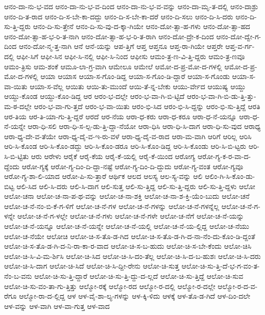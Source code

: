 {ಆನಂ-ದಾ-ನು-ಭ-ವದ
ಆನಂ-ದಾ-ನು-ಭ-ವ-ದಿಂದ
ಆನಂ-ದಾ-ನು-ಭ-ವ-ವನ್ನು
ಆನಂ-ದಾ-ಮೃ-ತ-ದಲ್ಲಿ
ಆನಂ-ದಾಶ್ರು
ಆನಂ-ದಿ-ತ-ರಾದ
ಆನಂ-ದಿ-ಸ-ಬೇ-ಕಾ-ದದ್ದು
ಆನಂ-ದಿ-ಸ-ಬೇ-ಕಾ-ದರೆ
ಆನಂ-ದಿ-ಸಲು
ಆನಂ-ದಿ-ಸಿ-ದರು
ಆನಂ-ದಿ-ಸು-ತ್ತಿ-ದ್ದರು
ಆನಂ-ದಿ-ಸು-ತ್ತೇನೆ
ಆನಂ-ದಿ-ಸು-ವು-ದ-ಕ್ಕಾ-ಗಿಯೇ
ಆನಂ-ದೋ-ತ್ಸಾ-ಹ-ಗಳು
ಆನಂ-ದೋ-ತ್ಸಾ-ಹದ
ಆನಂ-ದೋ-ತ್ಸಾ-ಹ-ಭ-ರಿ-ತ-ನಾಗಿ
ಆನಂ-ದೋ-ತ್ಸಾ-ಹ-ಭ-ರಿ-ತ-ರಾಗಿ
ಆನಂ-ದೋ-ದ್ರೇ-ಕ-ದಿಂದ
ಆನಂ-ದೋ-ದ್ವೇ-ಗ-ದಿಂದ
ಆನಂ-ದೋ-ನ್ಮ-ತ್ತ-ನಾಗಿ
ಆನೆ
ಆನೆ-ಯನ್ನು
ಆಪ-ತ್ತಿಗೆ
ಆಪ್ತ
ಆಪ್ತನೂ
ಆಪ್ತ-ರಾ-ಗಿಯೇ
ಆಪ್ತರೇ
ಆಪ್ತ-ವ-ರ್ಗ-ದಲ್ಲಿ
ಆಫೀ-ಸಿಗೆ
ಆಫೀ-ಸಿನ
ಆಫೀ-ಸಿ-ನಲ್ಲಿ
ಆಫೀ-ಸಿ-ನಿಂದ
ಆಫೀಸು
ಆಮಂ-ತ್ರ-ಣ-ವಿ-ತ್ತಿ-ದ್ದರು
ಆಮಂ-ತ್ರ-ಣವೂ
ಆಮಂ-ತ್ರಿಸು
ಆಮ-ಶಂಕೆ
ಆಮೂ-ಲಾ-ಗ್ರ-ವಾಗಿ
ಆಮೇಲೂ
ಆಮೇಲೆ
ಆಮೋ-ದ-ಪ್ರ-ಮೋ-ದ-ಗಳಲ್ಲಿ
ಆಮೋ-ದ-ಪ್ರ-ಮೋ-ದ-ಗಳಲ್ಲಿ
ಆಯಾ
ಆಯಾಸ
ಆಯಾ-ಸ-ಗೊಂ-ಡಿದ್ದ
ಆಯಾ-ಸ-ಗೊಂ-ಡಿ-ದ್ದಾರೆ
ಆಯಾ-ಸ-ಗೊಂಡು
ಆಯಾ-ಸ-ವಾ-ಯಿತು
ಆಯಾ-ಸ-ವೆಲ್ಲ
ಆಯಿತು
ಆಯಿ-ತು-ಮುಂದೆ
ಆಯಿ-ತೆ-ನ್ನ-ಬೇಕು
ಆಯು-ರ್ವೇದ
ಆಯುಷ್ಯ
ಆಯ್ದು
ಆಯ್ದು-ಕೊಂಡ
ಆಯ್ದು-ಕೊಂ-ಡಿದ್ದ
ಆರ
ಆರಂ-ಭ-ದಲ್ಲೇ
ಆರಂ-ಭ-ವಾ-ಗಿ-ಬಿ-ಟ್ಟಿದೆ
ಆರಂ-ಭ-ವಾ-ಗಿ-ಬಿ-ಡು-ತ್ತಿ-ತ್ತು-ಮ-ಠ-ದಲ್ಲೇ
ಆರಂ-ಭ-ವಾ-ಗು-ತ್ತದೆ
ಆರಂ-ಭ-ವಾ-ಯಿತು
ಆರಂ-ಭಿ-ಸಿದ
ಆರಂ-ಭಿ-ಸಿ-ದ್ದನ್ನು
ಆರಂ-ಭಿ-ಸು-ತ್ತಿದ್ದೆ
ಆರತಿ
ಆರ-ತಿಯ
ಆರ-ತಿ-ಯಾ-ಗು-ತ್ತಿ-ದ್ದರೆ
ಆರದೆ
ಆರ-ನೆಯ
ಆರಾ-ಧ-ಕರು
ಆರಾ-ಧ-ಕರೂ
ಆರಾ-ಧ-ನೆ-ಯನ್ನೂ
ಆರಾ-ಧ-ನೆ-ಯನ್ನೇ
ಆರಾ-ಧಿ-ಸಲಿ
ಆರಾ-ಧಿ-ಸ-ಲ್ಪ-ಡು-ತ್ತಿ-ದ್ದಾ-ನೆಯೋ
ಆರಾ-ಧಿಸಿ
ಆರಾ-ಧಿ-ಸಿ-ದಾಗ
ಆರಾ-ಧಿ-ಸು-ವುದ
ಆರಾಧ್ಯ
ಆರಾ-ಧ್ಯ-ದೇ-ವ-ತೆಯೇ
ಆರಾ-ಧ್ಯ-ದೈ-ವ-ಇ-ರು-ವಳೆ
ಆರಾ-ಧ್ಯ-ದೈ-ವ-ರಾದ
ಆರಾ-ಮ-ವಾಗಿ
ಆರಿಗೆ
ಆರಿಲ್ಲ
ಆರಿಸಿ
ಆರಿ-ಸಿ-ಕೊಂಡ
ಆರಿ-ಸಿ-ಕೊಂ-ಡದ್ದು
ಆರಿ-ಸಿ-ಕೊಂ-ಡರೂ
ಆರಿ-ಸಿ-ಕೊಂ-ಡಿದ್ದ
ಆರಿ-ಸಿ-ಕೊಂಡು
ಆರಿ-ಸಿ-ಬಿ-ಟ್ಟರು
ಆರಿ-ಸಿ-ಬಿ-ಟ್ಟಿತು
ಆರು
ಆರೇಳು
ಆರೈಕೆ
ಆರೈ-ಕೆಯ
ಆರೈ-ಕೆ-ಯಲ್ಲಿ
ಆರೈ-ಕೆ-ಯಿಂದ
ಆರೋಗ್ಯ
ಆರೋ-ಗ್ಯ-ಕ-ರ-ವಾ-ದ-ದ್ದೆಂದು
ಆರೋ-ಗ್ಯಕ್ಕೆ
ಆರೋ-ಗ್ಯ-ದಿಂ-ದಿ-ದ್ದಾ-ನಷ್ಟೆ
ಆರೋ-ಗ್ಯ-ದಿಂ-ದಿ-ದ್ದುದು
ಆರೋ-ಗ್ಯ-ವಂತ
ಆರೋ-ಗ್ಯವೂ
ಆರೋ-ಗ್ಯ-ಶಾ-ಲಿ-ಯಾದ
ಆರೋ-ಪಿ-ಸು-ತ್ತಾರೆ
ಆರ್ಥಿಕ
ಆಲದ
ಆಲಸ್ಯ
ಆಲ-ಸ್ಯ-ವನ್ನು
ಆಲಿ
ಆಲಿಂ-ಗಿ-ಸಿ-ಕೊಂ-ಡು-ಬಿಟ್ಟ
ಆಲಿ-ಸಿದ
ಆಲಿ-ಸಿ-ದರು
ಆಲಿ-ಸಿ-ದಾಗ
ಆಲಿ-ಸುತ್ತ
ಆಲಿ-ಸು-ತ್ತಿದ್ದ
ಆಲಿ-ಸು-ತ್ತಿ-ದ್ದರು
ಆಲಿ-ಸು-ತ್ತಿ-ದ್ದಳು
ಆಲೋ
ಆಲೋ-ಚನಾ
ಆಲೋ-ಚ-ನಾ-ಪ-ಥ-ವನ್ನು
ಆಲೋ-ಚ-ನಾ-ಶಕ್ತಿ
ಆಲೋ-ಚ-ನಾ-ಶ-ಕ್ತಿ-ಯೆಂ-ಬುದು
ಆಲೋ-ಚನೆ
ಆಲೋ-ಚ-ನೆ-ನಂ-ಬಿ-ಕೆ-ಗ-ಳಿಗೆ
ಆಲೋ-ಚ-ನೆ-ಗಳ
ಆಲೋ-ಚ-ನೆ-ಗಳನ್ನು
ಆಲೋ-ಚ-ನೆ-ಗಳನ್ನೆಲ್ಲ
ಆಲೋ-ಚ-ನೆ-ಗ-ಳನ್ನೇ
ಆಲೋ-ಚ-ನೆ-ಗ-ಳಲ್ಲೇ
ಆಲೋ-ಚ-ನೆ-ಗಳು
ಆಲೋ-ಚ-ನೆ-ಗಳೇ
ಆಲೋ-ಚ-ನೆಗೆ
ಆಲೋ-ಚ-ನೆ-ಯನ್ನು
ಆಲೋ-ಚ-ನೆ-ಯನ್ನೂ
ಆಲೋ-ಚ-ನೆ-ಯನ್ನೇ
ಆಲೋ-ಚ-ನೆ-ಯಲ್ಲಿ
ಆಲೋ-ಚ-ನೆ-ಯ-ಲ್ಲಿದ್ದ
ಆಲೋ-ಚ-ನೆಯು
ಆಲೋ-ಚ-ನೆಯೇ
ಆಲೋಚಿ
ಆಲೋ-ಚಿ-ಸ-ತೊ-ಡ-ಗಿದ
ಆಲೋ-ಚಿ-ಸ-ತೊ-ಡ-ಗಿ-ದ-ನಾ-ನೆಂ-ದು-ಕೊಂ-ಡಿ-ದ್ದಂತೆ
ಆಲೋ-ಚಿ-ಸ-ತೊ-ಡ-ಗಿ-ದ-ನಿ-ರಾ-ಕಾ-ರ-ವಾದ
ಆಲೋ-ಚಿ-ಸ-ಬ-ಹುದು
ಆಲೋ-ಚಿ-ಸ-ಬೇ-ಕೆಂದು
ಆಲೋ-ಚಿಸಿ
ಆಲೋ-ಚಿ-ಸಿ-ವಿ-ಮ-ರ್ಶಿಸಿ
ಆಲೋ-ಚಿ-ಸಿದ
ಆಲೋ-ಚಿ-ಸಿ-ದಂ-ತೆಲ್ಲ
ಆಲೋ-ಚಿ-ಸಿ-ದ-ಬ-ಹುಶಃ
ಆಲೋ-ಚಿ-ಸಿ-ದರು
ಆಲೋ-ಚಿ-ಸಿ-ದಾಗ
ಆಲೋ-ಚಿ-ಸಿದೆ
ಆಲೋ-ಚಿ-ಸಿ-ದ್ದೀ-ರೇನು
ಆಲೋ-ಚಿ-ಸುತ್ತ
ಆಲೋ-ಚಿ-ಸು-ತ್ತಿ-ದೆ-ಭ-ಗ-ವಂ-ತ-ನೆಂ-ಬ-ವನು
ಆಲೋ-ಚಿ-ಸು-ತ್ತಿ-ದ್ದಾರೆ
ಆಲೋ-ಚಿ-ಸು-ತ್ತಿ-ದ್ದು-ದ-ಲ್ಲದೆ
ಆಲೋ-ಚಿ-ಸು-ತ್ತಿದ್ದೆ
ಆಲೋ-ಚಿ-ಸುವ
ಆಲೋ-ಚಿ-ಸು-ವಂ-ತಾ-ಗು-ತ್ತಿತ್ತು
ಆಲ್ಮೋ-ರಕ್ಕೆ
ಆಲ್ಮೋ-ರದ
ಆಲ್ಮೋ-ರ-ದಲ್ಲಿ
ಆಲ್ಮೋ-ರ-ದಲ್ಲೇ
ಆಲ್ಮೋ-ರ-ದ-ವ-ರೆಗೂ
ಆಲ್ಮೋ-ರಾ-ದ-ಲ್ಲಿದ್ದ
ಆಳ
ಆಳ-ವೈ-ಶಾ-ಲ್ಯ-ಗಳನ್ನು
ಆಳ-ಕ್ಕಿ-ಳಿದು
ಆಳಕ್ಕೆ
ಆಳ-ತೊ-ಡ-ಗಿದೆ
ಆಳ-ದಿಂ-ದಲೇ
ಆಳ-ವನ್ನು
ಆಳ-ವಾಗಿ
ಆಳ-ವಾ-ಗುತ್ತ
ಆಳ-ವಾದ
}
